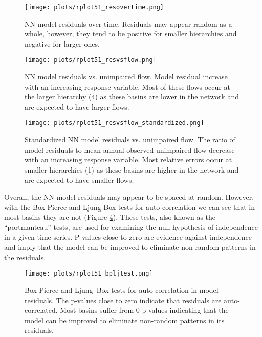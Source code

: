 \begin{figure}
	\centering
	\texttt{[image: plots/rplot51\_resovertime.png]}
	\caption[NN model residuals over time.]{NN model residuals over time. Residuals may appear random as a whole, however, they tend to be positive for smaller hierarchies and negative for larger ones.} 
	\label{fig:modrestime}
\end{figure}

\begin{figure}
	\centering
	\texttt{[image: plots/rplot51\_resvsflow.png]}
	\caption[NN model residuals vs. unimpaired flow.]{NN model residuals vs. unimpaired flow. Model residual increase with an increasing response variable. Most of these flows occur at the larger hierarchy (4) as these basins are lower in the network and are expected to have larger flows.} 
	\label{fig:modresvsflow}
\end{figure}

\begin{figure}
	\centering
	\texttt{[image: plots/rplot51\_resvsflow\_standardized.png]}
	\caption[Standardized NN model residuals vs. unimpaired flow.]{Standardized NN model residuals vs. unimpaired flow. The ratio of model residuals to mean annual observed unimpaired flow decrease with an increasing response variable. Most relative errors occur at smaller hierarchies (1) as these basins are higher in the network and are expected to have smaller flows.} 
	\label{fig:modresvsflowstd}
\end{figure}

Overall, the NN model residuals may appear to be spaced at random. However, with the Box-Pierce and Ljung-Box tests for auto-correlation we can see that in most basins they are not (Figure \ref{fig:bpljtest}). These tests, also known as the ``portmanteau'' tests, are used for examining the null hypothesis of independence in a given time series. P-values close to zero are evidence against independence and imply that the model can be improved to eliminate non-random patterns in the residuals.  

\begin{figure}
	\centering
	\texttt{[image: plots/rplot51\_bpljtest.png]}
	\caption[Box-Pierce and Ljung–Box tests for auto-correlation in model residuals.]{Box-Pierce and Ljung–Box tests for auto-correlation in model residuals. The p-values close to zero indicate that residuals are auto-correlated. Most basins suffer from 0 p-values indicating that the model can be improved to eliminate non-random patterns in its residuals.} 
	\label{fig:bpljtest}
\end{figure}

